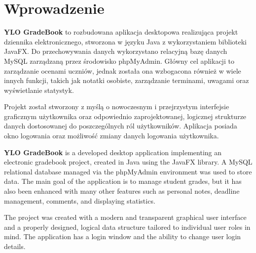 \chapter{Wprowadzenie}
\label{cha:wprowadzenie}

\textbf{YLO GradeBook} to rozbudowana aplikacja desktopowa realizująca projekt dziennika elektronicznego, stworzona w języku Java z wykorzystaniem biblioteki JavaFX. Do przechowywania danych wykorzystano relacyjną bazę danych MySQL zarządzaną przez środowisko phpMyAdmin. Główny cel aplikacji to zarządzanie ocenami uczniów, jednak została ona wzbogacona również w wiele innych funkcji, takich jak notatki osobiste, zarządzanie terminami, uwagami oraz wyświetlanie statystyk.

Projekt został stworzony z myślą o nowoczesnym i przejrzystym interfejsie graficznym użytkownika oraz odpowiednio zaprojektowanej, logicznej strukturze danych dostosowanej do poszczególnych ról użytkowników. Aplikacja posiada okno logowania oraz możliwość zmiany danych logowania użytkownika.

\vspace{1em}

\textbf{YLO GradeBook} is a developed desktop application implementing an electronic gradebook project, created in Java using the JavaFX library. A MySQL relational database managed via the phpMyAdmin environment was used to store data. The main goal of the application is to manage student grades, but it has also been enhanced with many other features such as personal notes, deadline management, comments, and displaying statistics.

The project was created with a modern and transparent graphical user interface and a properly designed, logical data structure tailored to individual user roles in mind. The application has a login window and the ability to change user login details.
